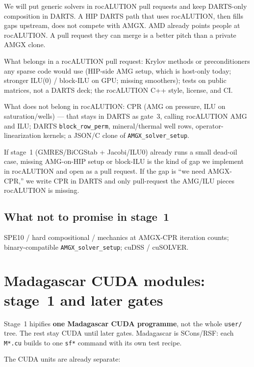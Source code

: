 \documentclass[11pt,a4paper]{article}
\begin{document}
We will put generic solvers in rocALUTION pull requests and keep DARTS-only composition in DARTS.
A HIP DARTS path that uses rocALUTION, then fills gaps upstream, does not compete with AMGX.
AMD already points people at rocALUTION.
A pull request they can merge is a better pitch than a private AMGX clone.

What belongs in a rocALUTION pull request:
Krylov methods or preconditioners any sparse code would use (HIP-side AMG setup, which is host-only today; stronger ILU(0) / block-ILU on GPU; missing smoothers);
tests on public matrices, not a DARTS deck;
the rocALUTION C++ style, license, and CI.

What does not belong in rocALUTION:
CPR (AMG on pressure, ILU on saturation/wells) --- that stays in DARTS as gate~3, calling rocALUTION AMG and ILU;
DARTS \texttt{block\_row\_perm}, mineral/thermal well rows, operator-linearization kernels;
a JSON/C clone of \texttt{AMGX\_solver\_setup}.

If stage~1 (GMRES/BiCGStab + Jacobi/ILU0) already runs a small dead-oil case, missing AMG-on-HIP setup or block-ILU is the kind of gap we implement in rocALUTION and open as a pull request.
If the gap is ``we need AMGX-CPR,'' we write CPR in DARTS and only pull-request the AMG/ILU pieces rocALUTION is missing.

\subsection*{What not to promise in stage~1}

SPE10 / hard compositional / mechanics at AMGX-CPR iteration counts;
binary-compatible \texttt{AMGX\_solver\_setup}; cuDSS / cuSOLVER.

\section{Madagascar CUDA modules: stage~1 and later gates}

Stage~1 hipifies \textbf{one Madagascar CUDA programme}, not the whole \texttt{user/} tree.
The rest stay CUDA until later gates.
Madagascar is SCons/RSF: each \texttt{M*.cu} builds to one \texttt{sf*} command with its own test recipe.

The CUDA units are already separate:
\end{document}
